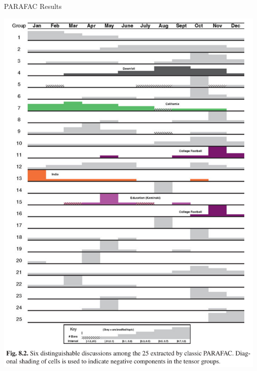 \documentclass[handout]{beamer}
\begin{document}
\begin{frame}{PARAFAC Results}
    \begin{center}
    \includegraphics[max height=0.8\textheight]{images/enron-parafac}
    \end{center}
\end{frame}
\end{document}
